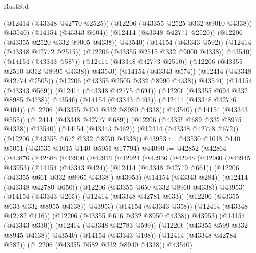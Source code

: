 \begin{lexlean}{RustStd}
\begin{coremodule}
                    (@12414 (@43348 @42770 @2525))
                    (@12206 (@43355 @2525 @332 @9010 @4338))
                    @43540)
                  (@14154 (@43343 @604))
                  (@12414 (@43348 @42771 @2520))
                  (@12206 (@43355 @2520 @332 @9005 @4338))
                  @43540)
                (@14154 (@43343 @592))
                (@12414 (@43348 @42772 @2515))
                (@12206 (@43355 @2515 @332 @9000 @4338))
                @43540)
              (@14154 (@43343 @587))
              (@12414 (@43348 @42773 @2510))
              (@12206 (@43355 @2510 @332 @8995 @4338))
              @43540)
            (@14154 (@43343 @574))
            (@12414 (@43348 @42774 @2505))
            (@12206 (@43355 @2505 @332 @8990 @4338))
            @43540)
          (@14154 (@43343 @569))
          (@12414 (@43348 @42775 @694))
          (@12206 (@43355 @694 @332 @8985 @4338))
          @43540)
        (@14154 (@43343 @403))
        (@12414 (@43348 @42776 @404))
        (@12206 (@43355 @404 @332 @8980 @4338))
        @43540)
      (@14154 (@43343 @555))
      (@12414 (@43348 @42777 @689))
      (@12206 (@43355 @689 @332 @8975 @4338))
      @43540)
    (@14154 (@43343 @462))
    (@12414 (@43348 @42778 @672))
    (@12206 (@43355 @672 @332 @8970 @4338))
@43953 := @43530 @1018 @140 @5051 (@43535 @1015 @140 @5050 @17794)
@44090 := @42852
    (@42864
      (@42876
        (@42888
          (@42900
            (@42912
              (@42924
                (@42936
                  (@42948
                    (@42960
                      (@43945 @43953)
                      (@14154 (@43343 @424))
                      (@12414 (@43348 @42779 @661))
                      (@12206 (@43355 @661 @332 @8965 @4338))
                      @43953)
                    (@14154 (@43343 @284))
                    (@12414 (@43348 @42780 @650))
                    (@12206 (@43355 @650 @332 @8960 @4338))
                    @43953)
                  (@14154 (@43343 @265))
                  (@12414 (@43348 @42781 @633))
                  (@12206 (@43355 @633 @332 @8955 @4338))
                  @43953)
                (@14154 (@43343 @358))
                (@12414 (@43348 @42782 @616))
                (@12206 (@43355 @616 @332 @8950 @4338))
                @43953)
              (@14154 (@43343 @330))
              (@12414 (@43348 @42783 @599))
              (@12206 (@43355 @599 @332 @8945 @4338))
              @43540)
            (@14154 (@43343 @108))
            (@12414 (@43348 @42784 @582))
            (@12206 (@43355 @582 @332 @8940 @4338))
            @43540)

\end{coremodule}
\end{lexlean}
